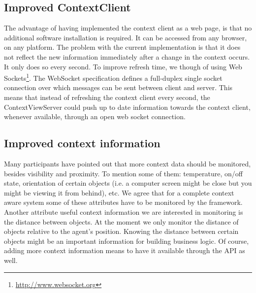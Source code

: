 \subsection{Improved ContextClient}
The advantage of having implemented the context client as a web page, is that no additional software installation is required. It can be accessed from any browser, on any platform. The problem with the current implementation is that it does not reflect the new information immediately after a change in the context occurs. It only does so every second. To improve refresh time, we though of using Web Sockets\footnote{\url{http://www.websocket.org}}. The WebSocket specification defines a full-duplex single socket connection over which messages can be sent between client and server. This means that instead of refreshing the context client every second, the ContextViewServer could push up to date information towards the context client, whenever available, through an open web socket connection.

\subsection{Improved context information} 
Many participants have pointed out that more context data should be monitored, besides visibility and proximity. To mention some of them: temperature, on/off state, orientation of certain objects (i.e. a computer screen might be close but you might be viewing it from behind), etc. We agree that for a complete context aware system some of these attributes have to be monitored by the framework. Another attribute useful context information we are interested in monitoring is the distance between objects. At the moment we only monitor the distance of objects relative to the agent's position. Knowing the distance between certain objects might be an important information for building business logic. Of course, adding more context information means to have it available through the API as well.\\

